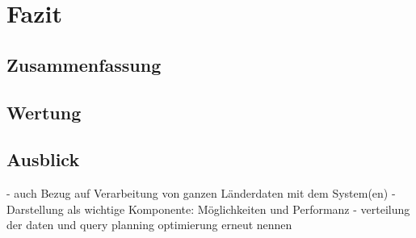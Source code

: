 \chapter{Fazit}

\section{Zusammenfassung}



\section{Wertung}


\section{Ausblick}

- auch Bezug auf Verarbeitung von ganzen Länderdaten mit dem System(en)
- Darstellung als wichtige Komponente: Möglichkeiten und Performanz
- verteilung der daten und query planning optimierung erneut nennen





\label{LastPage}